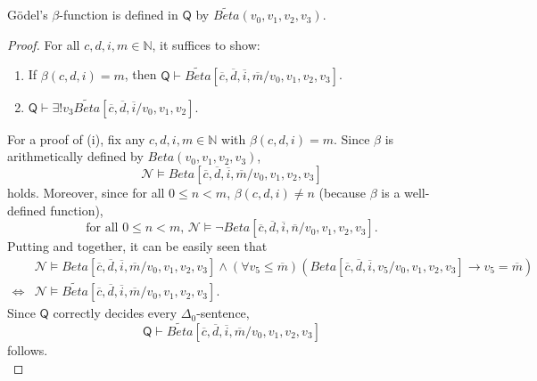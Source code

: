 \begin{lem}
G\"odel's $\beta$-function is defined in $\mathsf{Q}$ by $\mathit{\widetilde{Beta}}(v_0, v_1, v_2, v_3)$.
\end{lem}
\begin{proof}
For all $c,d,i,m \in \mathbb{N}$, it suffices to show:
\begin{enumerate}
\item If $\beta(c,d,i) = m$, then $\mathsf{Q}\vdash \mathit{\widetilde{Beta}}[\overline{c}, \overline{d}, \overline{i}, \overline{m}/v_0, v_1, v_2, v_3]$.
\item $\mathsf{Q} \vdash  \exists ! v_3  \mathit{\widetilde{Beta}}[\overline{c}, \overline{d}, \overline{i}/v_0, v_1, v_2]$.
\end{enumerate}

For a proof of (i), fix any $c,d,i,m \in \mathbb{N}$ with $\beta(c,d,i)=m$. Since $\beta$ is arithmetically defined by $\mathit{Beta}(v_0,v_1,v_2,v_3)$,
\begin{equation}\label{eq:g1}
\mathcal{N} \vDash \mathit{Beta}[\overline{c}, \overline{d}, \overline{i}, \overline{m}/v_0, v_1, v_2, v_3]
\end{equation}
holds. Moreover, since for all $0 \le n< m$, $\beta(c,d,i) \neq n$  (because $\beta$ is a well-defined function),
\begin{equation}\label{eq:g2}
\text{for all }0 \le n<m \text{, } \mathcal{N}\vDash \lnot \mathit{Beta}[\overline{c}, \overline{d}, \overline{i}, \overline{n}/v_0, v_1, v_2, v_3].
\end{equation}
Putting  and  together, it can be easily seen that
\begin{align*}
& \mathcal{N} \vDash \mathit{Beta}[\overline{c}, \overline{d}, \overline{i}, \overline{m}/v_0, v_1, v_2, v_3]\wedge (\forall v_5 \le \overline{m})(\mathit{Beta}[\overline{c}, \overline{d}, \overline{i},v_5/v_0, v_1,v_2,v_3] \rightarrow v_5 = \overline{m}) \\
\Leftrightarrow & \mathcal{N} \vDash \widetilde{\mathit{Beta}}[\overline{c}, \overline{d}, \overline{i}, \overline{m}/v_0, v_1, v_2, v_3].
\end{align*}
Since $\mathsf{Q}$ correctly decides every $\Delta_0$-sentence, 
\[ \mathsf{Q} \vdash \widetilde{\mathit{Beta}}[\overline{c}, \overline{d}, \overline{i}, \overline{m}/v_0, v_1, v_2, v_3] \]
follows.
\\


\end{proof}
